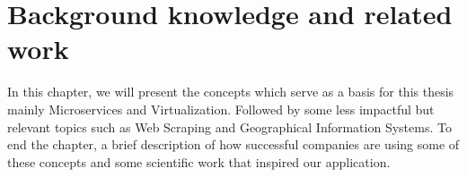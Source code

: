 \chapter{Background knowledge and related work}
\label{cha:sota}



In this chapter, we will present the concepts which serve as a basis for this thesis mainly Microservices and Virtualization. Followed by some less impactful but relevant topics such as Web Scraping and Geographical Information Systems. To end the chapter, a brief description of how successful companies are using some of these concepts and some scientific work that inspired our application.








